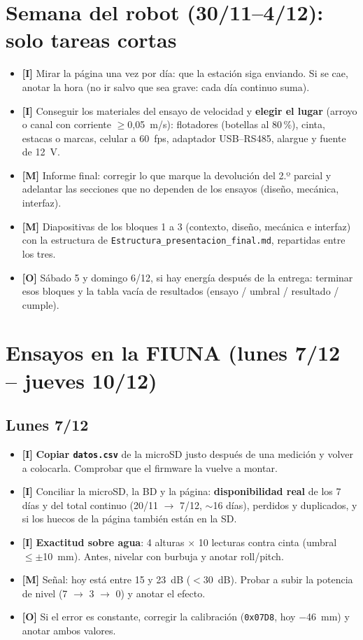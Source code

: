 \documentclass[11pt,a4paper]{article}
\newcommand{\imp}{\textcolor{rojo}{\textbf{[I]}}}
\newcommand{\mej}{\textcolor{ambar}{\textbf{[M]}}}
\newcommand{\opc}{\textcolor{gris}{\textbf{[O]}}}
\begin{document}
\section{Semana del robot (30/11--4/12): solo tareas cortas}

\begin{itemize}
  \item \imp{} Mirar la página una vez por día: que la estación siga enviando. Si se cae, anotar la
        hora (no ir salvo que sea grave: cada día continuo suma).
  \item \imp{} Conseguir los materiales del ensayo de velocidad y \textbf{elegir el lugar} (arroyo o
        canal con corriente $\geq$0,05~m/s): flotadores (botellas al 80\,\%), cinta, estacas o marcas,
        celular a 60~fps, adaptador USB--RS485, alargue y fuente de 12~V.
  \item \mej{} Informe final: corregir lo que marque la devolución del 2.º parcial y adelantar las
        secciones que no dependen de los ensayos (diseño, mecánica, interfaz).
  \item \mej{} Diapositivas de los bloques 1 a 3 (contexto, diseño, mecánica e interfaz) con la
        estructura de \texttt{Estructura\_presentacion\_final.md}, repartidas entre los tres.
  \item \opc{} Sábado 5 y domingo 6/12, si hay energía después de la entrega: terminar esos
        bloques y la tabla vacía de resultados (ensayo / umbral / resultado / cumple).
\end{itemize}

\section{Ensayos en la FIUNA (lunes 7/12 -- jueves 10/12)}

\subsection{Lunes 7/12}
\begin{itemize}
  \item \imp{} \textbf{Copiar \texttt{datos.csv}} de la microSD justo después de una medición y
        volver a colocarla. Comprobar que el firmware la vuelve a montar.
  \item \imp{} Conciliar la microSD, la BD y la página: \textbf{disponibilidad real} de los 7 días y
        del total continuo (20/11 $\to$ 7/12, $\sim$16 días), perdidos y duplicados, y si los huecos de
        la página también están en la SD.
  \item \imp{} \textbf{Exactitud sobre agua}: 4 alturas $\times$ 10 lecturas contra cinta
        (umbral $\leq\pm$10~mm). Antes, nivelar con burbuja y anotar roll/pitch.
  \item \mej{} Señal: hoy está entre 15 y 23~dB ($<$30~dB). Probar a subir la potencia de nivel
        (7 $\to$ 3 $\to$ 0) y anotar el efecto.
  \item \opc{} Si el error es constante, corregir la calibración (\texttt{0x07D8}, hoy
        $-$46~mm) y anotar ambos valores.
\end{itemize}
\end{document}
